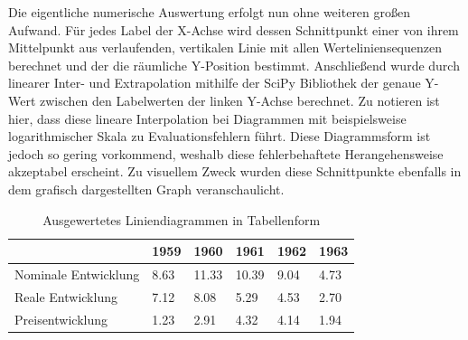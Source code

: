 Die eigentliche numerische Auswertung erfolgt nun ohne weiteren großen Aufwand. Für jedes Label der X-Achse wird dessen Schnittpunkt einer von ihrem Mittelpunkt aus verlaufenden, vertikalen Linie mit allen Werteliniensequenzen berechnet und der die räumliche Y-Position bestimmt. Anschließend wurde durch linearer Inter- und Extrapolation mithilfe der SciPy \cite{2020SciPy-NMeth} Bibliothek der genaue Y-Wert zwischen den Labelwerten der linken Y-Achse berechnet. Zu notieren ist hier, dass diese lineare Interpolation bei Diagrammen mit beispielsweise logarithmischer Skala zu Evaluationsfehlern führt. Diese Diagrammsform ist jedoch so gering vorkommend, weshalb diese fehlerbehaftete Herangehensweise akzeptabel erscheint. Zu visuellem Zweck wurden diese Schnittpunkte ebenfalls in dem grafisch dargestellten Graph veranschaulicht.

\begin{table}[h!]
    \centering
    \begin{tabular}{|l|l|l|l|l|l|}
        \hline
        \rowcolor[HTML]{EFEFEF}
                             & 1959 & 1960  & 1961  & 1962 & 1963 \\ \hline
        Nominale Entwicklung & 8.63 & 11.33 & 10.39 & 9.04 & 4.73 \\ \hline
        Reale Entwicklung    & 7.12 & 8.08  & 5.29  & 4.53 & 2.70 \\ \hline
        Preisentwicklung     & 1.23 & 2.91  & 4.32  & 4.14 & 1.94 \\ \hline
    \end{tabular}
    \caption{Ausgewertetes Liniendiagrammen in Tabellenform}
\end{table}

